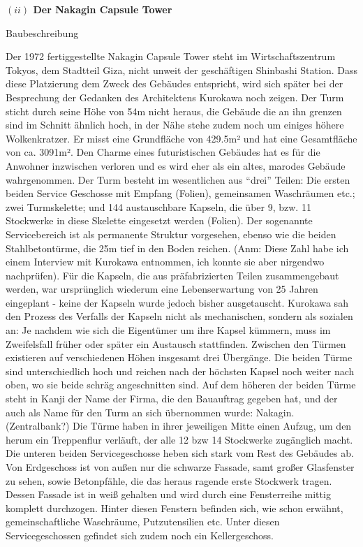 \documentclass[a4paper, 12pt]{article}
\begin{document}
\begin{onehalfspace}
\vspace{5mm}
\noindent\textbf{$(ii)$ Der Nakagin Capsule Tower}


Baubeschreibung

Der 1972 fertiggestellte Nakagin Capsule Tower steht im Wirtschaftszentrum Tokyos, dem Stadtteil Giza, nicht unweit der geschäftigen Shinbashi Station. Dass diese Platzierung dem Zweck des Gebäudes entspricht, wird sich später bei der Besprechung der Gedanken des Architektens Kurokawa noch zeigen. Der Turm sticht durch seine Höhe von 54m nicht heraus, die Gebäude die an ihn grenzen sind im Schnitt ähnlich hoch, in der Nähe stehe zudem noch um einiges höhere Wolkenkratzer. Er misst eine Grundfläche von 429.5m² und hat eine Gesamtfläche von ca. 3091m². Den Charme eines futuristischen Gebäudes hat es für die Anwohner inzwischen verloren und es wird eher als ein altes, marodes Gebäude wahrgenommen. 
Der Turm besteht im wesentlichen aus “drei” Teilen: Die ersten beiden Service Geschosse mit Empfang (Folien), gemeinsamen Waschräumen etc.; zwei Turmskelette; und 144 austauschbare Kapseln, die über 9, bzw. 11 Stockwerke in diese Skelette eingesetzt werden (Folien). Der sogenannte Servicebereich ist als permanente Struktur vorgesehen, ebenso wie die beiden Stahlbetontürme, die 25m tief in den Boden reichen. (Anm: Diese Zahl habe ich einem Interview mit Kurokawa entnommen, ich konnte sie aber nirgendwo nachprüfen). Für die Kapseln, die aus präfabrizierten Teilen zusammengebaut werden, war ursprünglich wiederum eine Lebenserwartung von 25 Jahren eingeplant - keine der Kapseln wurde jedoch bisher ausgetauscht. Kurokawa sah den Prozess des Verfalls der Kapseln nicht als mechanischen, sondern als sozialen an: Je nachdem wie sich die Eigentümer um ihre Kapsel kümmern, muss im Zweifelsfall früher oder später ein Austausch stattfinden. 
Zwischen den Türmen existieren auf verschiedenen Höhen insgesamt drei Übergänge. Die beiden Türme sind unterschiedlich hoch und reichen nach der höchsten Kapsel noch weiter nach oben, wo sie beide schräg angeschnitten sind. Auf dem höheren der beiden Türme steht in Kanji der Name der Firma, die den Bauauftrag gegeben hat, und der auch als Name für den Turm an sich übernommen wurde: Nakagin. (Zentralbank?) Die Türme haben in ihrer jeweiligen Mitte einen Aufzug, um den herum ein Treppenflur verläuft, der alle 12 bzw 14 Stockwerke zugänglich macht.
Die unteren beiden Servicegeschosse heben sich stark vom Rest des Gebäudes ab. Von Erdgeschoss ist von außen nur die schwarze Fassade, samt großer Glasfenster zu sehen, sowie Betonpfähle, die das heraus ragende erste Stockwerk tragen. Dessen Fassade ist in weiß gehalten und wird durch eine Fensterreihe mittig komplett durchzogen. Hinter diesen Fenstern befinden sich, wie schon erwähnt, gemeinschaftliche Waschräume, Putzutensilien etc. Unter diesen Servicegeschossen gefindet sich zudem noch ein Kellergeschoss. 

\end{onehalfspace}
\end{document}
